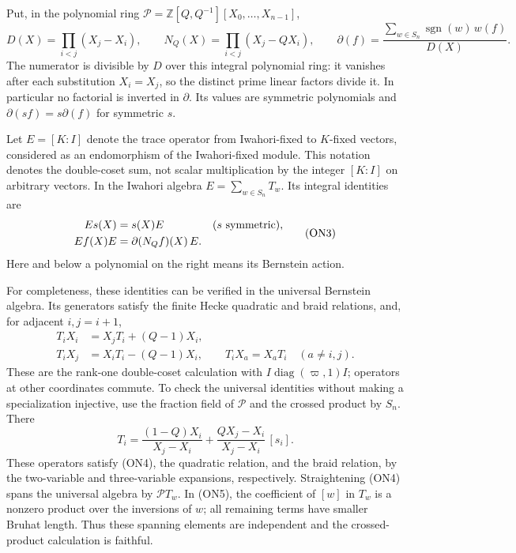 Put, in the polynomial ring \(\mathcal P=\mathbb Z[Q,Q^{-1}]
[X_0,\ldots,X_{n-1}]\),
\[
 D(X)=\prod_{i<j}(X_j-X_i),\qquad
 N_Q(X)=\prod_{i<j}(X_j-QX_i),\qquad
 \partial(f)=
 \frac{\sum_{w\in S_n}\operatorname{sgn}(w)\,w(f)}{D(X)}.
 \tag{ON2}
\]
The numerator is divisible by \(D\) over this integral polynomial
ring: it vanishes after each substitution \(X_i=X_j\), so the distinct
prime linear factors divide it.  In particular no factorial is
inverted in \(\partial\).  Its values are symmetric polynomials and
\(\partial(sf)=s\partial(f)\) for symmetric \(s\).

Let \(E=[K:I]\) denote the trace operator from Iwahori-fixed to
\(K\)-fixed vectors, considered as an endomorphism of the
Iwahori-fixed module.  This notation denotes the double-coset sum,
not scalar multiplication by the integer \([K:I]\) on arbitrary
vectors.  In the Iwahori algebra \(E=\sum_{w\in S_n}T_w\).
Its integral identities are
\[
 \begin{aligned}
 Es(X)&=s(X)E &&(s\ \hbox{symmetric}),\\
 E f(X)E&=\partial(N_Qf)(X)\,E .
 \end{aligned}
 \tag{ON3}
\]
Here and below a polynomial on the right means its Bernstein action.

For completeness, these identities can be verified in the universal
Bernstein algebra.  Its generators satisfy the finite Hecke
quadratic and braid relations, and, for adjacent \(i,j=i+1\),
\[
 \begin{split}
 T_iX_i&=X_jT_i+(Q-1)X_i,\\
 T_iX_j&=X_iT_i-(Q-1)X_i,\qquad
 T_iX_a=X_aT_i\quad(a\ne i,j).
 \end{split}
 \tag{ON4}
\]
These are the rank-one double-coset calculation with
\(I\operatorname{diag}(\varpi,1)I\); operators at other coordinates
commute.  To check the universal identities without making a
specialization injective, use the fraction field of \(\mathcal P\)
and the crossed product by \(S_n\).  There
\[
 T_i=
 \frac{(1-Q)X_i}{X_j-X_i}
   +\frac{QX_j-X_i}{X_j-X_i}\,[s_i].
 \tag{ON5}
\]
These operators satisfy (ON4), the quadratic relation, and the braid
relation, by the two-variable and three-variable expansions,
respectively.  Straightening (ON4) spans the universal algebra by
\(\mathcal P T_w\).  In (ON5), the coefficient of \([w]\) in \(T_w\)
is a nonzero product over the inversions of \(w\); all remaining
terms have smaller Bruhat length.  Thus these spanning elements are
independent and the crossed-product calculation is faithful.

